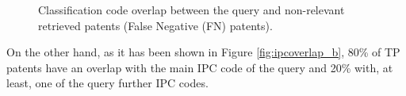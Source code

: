 \begin{figure}[t!]
\begin{centering}
\hspace*{0.5cm}   

\par\end{centering} 
\protect\caption{Classification code overlap between the query and non-relevant retrieved patents (False Negative (FN) patents).}
\label{fig:ipcoverlap}
\end{figure}
On the other hand, as it has been shown in Figure \ref{fig:ipcoverlap_b}, 80\% of TP patents have an overlap with the main IPC code of the query and 20\% with, at least, one of the query further IPC codes. 

